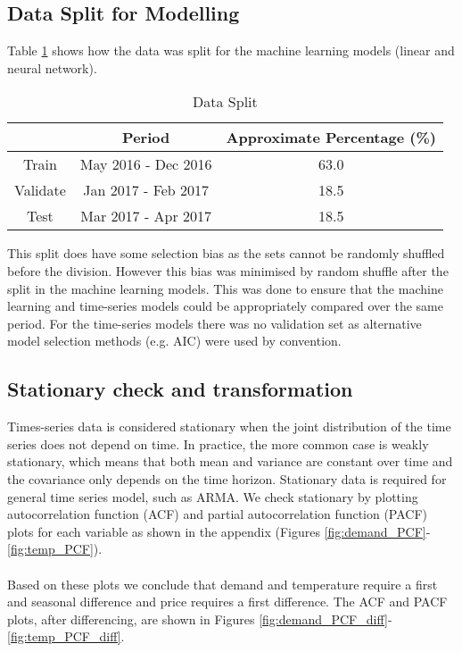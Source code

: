 \documentclass[11pt]{article}
\begin{document}
\subsection{Data Split for Modelling}
\label{section:data_split}

Table \ref{table:data_split} shows how the data was split for the machine learning models (linear and neural network). 

\begin{table}[H]
\centering
\caption{Data Split}
\label{table:data_split}
\begin{tabular}{@{}ccc@{}}
\toprule
 & \textbf{Period} & \textbf{Approximate Percentage (\%)} \\ \midrule
Train & May 2016 - Dec 2016 & 63.0 \\
Validate & Jan 2017 - Feb 2017 & 18.5 \\
Test & Mar 2017 - Apr 2017 & 18.5 \\ \bottomrule
\end{tabular}
\end{table}

\noindent This split does have some selection bias as the sets cannot be randomly shuffled before the division. However this bias was minimised by random shuffle after the split in the machine learning models. This was done to ensure that the machine learning and time-series models could be appropriately compared over the same period. For the time-series models there was no validation set as alternative model selection methods (e.g. AIC) were used by convention. 

\subsection{Stationary check and transformation}

Times-series data is considered stationary when the joint distribution of the time series does not depend on time. In practice, the more common case is weakly stationary, which means that both mean and variance are constant over time and the covariance only depends on the time horizon. Stationary data is required for general time series model, such as ARMA. We check stationary by plotting autocorrelation function (ACF) and partial autocorrelation function (PACF) plots for each variable as shown in the appendix (Figures \ref{fig:demand_PCF}-\ref{fig:temp_PCF}).
\\
\\
\noindent Based on these plots we conclude that demand and temperature require a first and seasonal difference and price requires a first difference. The ACF and PACF plots, after differencing, are shown in Figures \ref{fig:demand_PCF_diff}-\ref{fig:temp_PCF_diff}.
\end{document}
